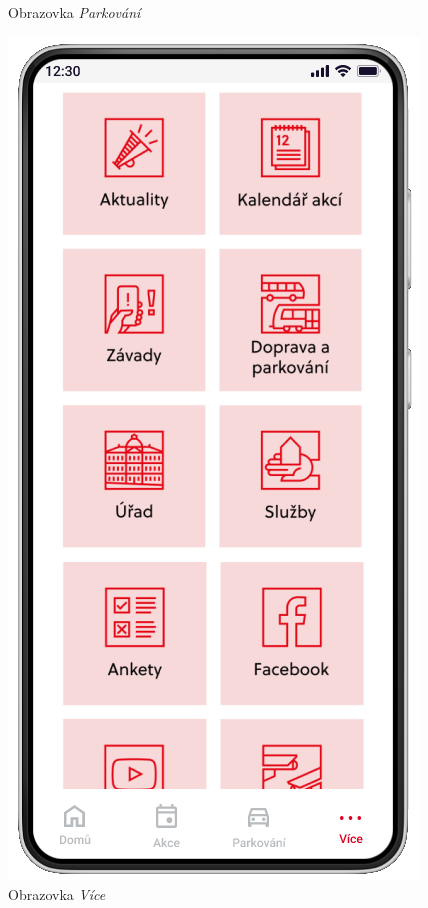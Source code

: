 \begin{minipage}[t]{0.45\textwidth}
\begin{figure}[H]
    \caption{Obrazovka \textit{Parkování}}
    \label{fig:mockup3}
  \end{figure}
  \begin{figure}[H]
    \centering
    \includegraphics[width=.7\textwidth]{screen4.png}
    \caption{Obrazovka \textit{Více}}
    \label{fig:mockup4}
  \end{figure}
\end{minipage}
